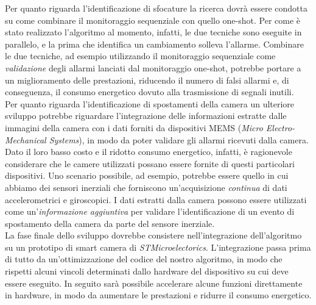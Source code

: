 Per quanto riguarda l'identificazione di sfocature la ricerca dovr\`a essere condotta su come combinare il monitoraggio sequenziale con quello one-shot.
Per come \`e stato realizzato l'algoritmo al momento, infatti, le due tecniche sono eseguite in parallelo, e la prima che identifica un cambiamento solleva l'allarme.
Combinare le due tecniche, ad esempio utilizzando il monitoraggio sequenziale come \textit{validazione} degli allarmi lanciati dal monitoraggio one-shot, potrebbe portare a un miglioramento delle prestazioni, riducendo il numero di falsi allarmi e, di conseguenza, il consumo energetico dovuto alla trasmissione di segnali inutili.\\
Per quanto riguarda l'identificazione di spostamenti della camera un ulteriore sviluppo potrebbe riguardare l'integrazione delle informazioni estratte dalle immagini della camera con i dati forniti da dispositivi MEMS (\textit{Micro Electro-Mechanical Systems}), in modo da poter validare gli allarmi ricevuti dalla camera.
Dato il loro basso costo e il ridotto consumo energetico, infatti, \`e ragionevole considerare che le camere utilizzati possano essere fornite di questi particolari dispositivi.
Uno scenario possibile, ad esempio, potrebbe essere quello in cui abbiamo dei sensori inerziali che forniscono un'acquisizione \textit{continua} di dati accelerometrici e giroscopici. 
I dati estratti dalla camera possono essere utilizzati come un'\textit{informazione aggiuntiva} per validare l'identificazione di un evento di spostamento della camera da parte del sensore inerziale.\\
La fase finale dello sviluppo dovrebbe consistere nell'integrazione dell'algoritmo su un prototipo di smart camera di \textit{STMicroelectorics}.
L'integrazione passa prima di tutto da un'ottimizzazione del codice del nostro algoritmo, in modo che rispetti alcuni vincoli determinati dallo hardware del dispositivo su cui deve essere eseguito.
In seguito sar\`a possibile accelerare alcune funzioni direttamente in hardware, in modo da aumentare le prestazioni e ridurre il consumo energetico.


